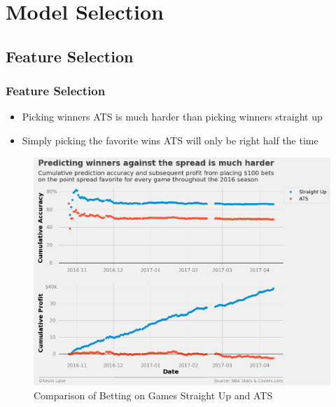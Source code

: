 \documentclass{beamer}
\begin{document}
\section{Model Selection}

\subsection{Feature Selection}
\begin{frame}
\frametitle{Feature Selection}
\begin{itemize}
    \item Picking winners ATS is much harder than picking winners straight up
    \item Simply picking the favorite wins ATS will only be right half the time
\end{itemize}
\begin{figure}
\includegraphics[scale=0.2]{../docs/assets/images/feature-selection/favorite-ats-profit.png}
\caption{Comparison of Betting on Games Straight Up and ATS}
\end{figure}
\end{frame}
\end{document}
